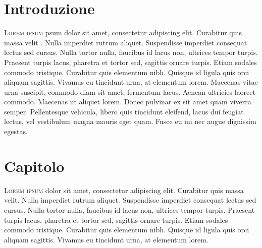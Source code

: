 \documentclass[a4paper, 11pt, oneside]{book}
\begin{document}
\tableofcontents

\clearpage
\sloppy
{}


\frenchspacing  %



\chapter{Introduzione}\label{ch:intro}

\vspace{10mm}


 \vspace{5mm}
 
\lettrine[lines=2, depth=0, lraise=-0.1, findent=0.3em, nindent=0.3em]{\color{BrickRed}\fontsize{50pt}{72pt}L}{orem ipsum} psum dolor sit amet, consectetur adipiscing elit. Curabitur quis massa velit \cite{10.2307/43707814}. Nulla imperdiet rutrum aliquet. Suspendisse imperdiet consequat lectus sed cursus. Nulla tortor nulla, faucibus id lacus non, ultrices tempor turpis. Praesent turpis lacus, pharetra et tortor sed, sagittis ornare turpis. Etiam sodales commodo tristique. Curabitur quis elementum nibh. Quisque id ligula quis orci aliquam sagittis. Vivamus eu tincidunt urna, at elementum lorem. Maecenas vitae urna suscipit, commodo diam sit amet, fermentum lacus. Aenean ultricies laoreet commodo. Maecenas ut aliquet lorem. Donec pulvinar ex sit amet quam viverra semper. Pellentesque vehicula, libero quis tincidunt eleifend, lacus dui feugiat lectus, vel vestibulum magna mauris eget quam. Fusce eu mi nec augue dignissim egestas. 

\chapter{Capitolo}\label{ch:1}

\lettrine[lines=2, depth=0, lraise=-0.1, findent=0.3em, nindent=0.3em]{\color{BrickRed}\fontsize{50pt}{72pt}L}{orem ipsum} dolor sit amet, consectetur adipiscing elit. Curabitur quis massa velit. Nulla imperdiet rutrum aliquet. Suspendisse imperdiet consequat lectus sed cursus. Nulla tortor nulla, faucibus id lacus non, ultrices tempor turpis. Praesent turpis lacus, pharetra et tortor sed, sagittis ornare turpis. Etiam sodales commodo tristique. Curabitur quis elementum nibh. Quisque id ligula quis orci aliquam sagittis. Vivamus eu tincidunt urna, at elementum lorem.
\end{document}
